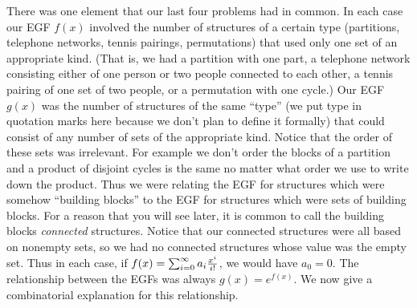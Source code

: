 \documentclass[10pt,]{book}
\theoremstyle{plain}
\theoremstyle{definition}
\numberwithin{equation}{chapter}
\begin{document}
There was one element that our last four problems had in common. In each case our EGF \(f(x)\) involved the number of structures of a certain type (partitions, telephone networks, tennis pairings, permutations) that used only one set of an appropriate kind. (That is, we had a partition with one part, a telephone network consisting either of one person or two people connected to each other, a tennis pairing of one set of two people, or a permutation with one cycle.) Our EGF \(g(x)\) was the number of structures of the same ``type'' (we put type in quotation marks here because we don't plan to define it formally) that could consist of any number of sets of the appropriate kind. Notice that the order of these sets was irrelevant. For example we don't order the blocks of a partition and a product of disjoint cycles is the same no matter what order we use to write down the product. Thus we were relating the EGF for structures which were somehow ``building blocks'' to the EGF for structures which were sets of building blocks. For a reason that you will see later, it is common to call the building blocks \emph{connected} structures. Notice that our connected structures were all based on nonempty sets, so we had no connected structures whose value was the empty set. Thus in each case, if \(f(x) = \sum_{i=0}^\infty a_i{x^i\over i!}\), we would have \(a_0=0\). The relationship between the EGFs was always \(g(x) = e^{f(x)}\). We now give a combinatorial explanation for this relationship.%
\end{document}
